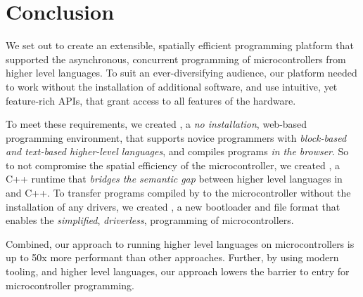 \section{Conclusion}
\label{sec:conclude}

We set out to create an extensible, spatially efficient programming platform that supported the asynchronous, concurrent programming of microcontrollers from higher level languages. To suit an ever-diversifying audience, our platform needed to work without the installation of additional software, and use intuitive, yet feature-rich APIs, that grant access to all features of the hardware.

To meet these requirements, we created \MCN, a \emph{no installation}, web-based programming environment, that supports novice programmers with \emph{block-based and text-based higher-level languages}, and compiles programs \emph{in the browser}. So to not compromise the spatial efficiency of the microcontroller, we created \CON, a C++ runtime that \emph{bridges the semantic gap} between higher level languages in \MC and C++. To transfer programs compiled by \MC to the microcontroller without the installation of any drivers, we created \UFN, a new bootloader and file format that enables the \emph{simplified}, \emph{driverless}, programming of microcontrollers.

Combined, our approach to running higher level languages on microcontrollers is up to 50x more performant than other approaches. Further, by using modern tooling, and higher level languages, our approach lowers the barrier to entry for microcontroller programming.


